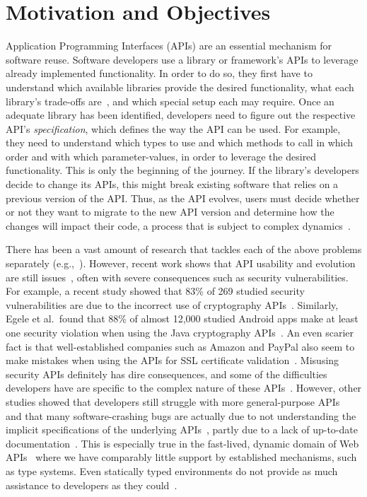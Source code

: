 \documentclass[sigconf]{acmart}
\newcommand{\updated}[1]{#1}
\begin{document}
\section{Motivation and Objectives}
Application Programming Interfaces (APIs) are an essential mechanism for software reuse. Software developers use a library or framework's APIs to leverage already implemented functionality. In order to do so, they first have to understand which available libraries provide the desired functionality, what each library's trade-offs are\updated{~\cite{ZHHK17}}, and which special setup each may require. Once an adequate library has been identified, developers need to figure out the respective API's \textit{specification}, which defines the way the API can be used. For example, they need to understand which types to use and which methods to call in which order and with which parameter-values, in order to leverage the desired functionality. This is only the beginning of the journey. If the library's developers decide to change its APIs, this might break existing software that relies on a previous version of the API\@. Thus, as the API evolves, users must decide whether or not they want to migrate to the new API version and determine how the changes will impact their code\updated{, a process that is subject to complex dynamics~\cite{JKR+17}}.

There has been a vast amount of research that tackles each of the above problems separately (e.g.,~\cite{Subramanian:2014,RobillardInferenceSurvey,RobillardLearn09, NNP+09, ThungLibRec}). However, recent work shows that API usability and evolution are still issues~\cite{NKMB16, BKHT:FSE16, SunshineAPIProtocol}, often with severe consequences such as security vulnerabilities. For example, a recent study showed that 83\% of 269 studied security vulnerabilities are due to the incorrect use of cryptography APIs~\cite{Lazar2014}. Similarly, Egele et al.~found that 88\% of almost 12,000 studied Android apps make at least one security violation when using the Java cryptography APIs~\cite{EgeleBFK13}. An even scarier fact is that well-established companies such as Amazon and PayPal also seem to make mistakes when using the APIs for SSL certificate validation~\cite{GeorgievIJABS12}. Misusing security APIs definitely has dire consequences, and some of the difficulties developers have are specific to the complex nature of these APIs~\cite{NKMB16}. However, other studies showed that developers still struggle with more general-purpose APIs~\cite{SunshineAPIProtocol} and that many software-crashing bugs are actually due to not understanding the implicit specifications of the underlying APIs~\cite{amani2016mubench}\updated{, partly due to a lack of up-to-date documentation~\cite{RMS17}. This is especially true in the fast-lived, dynamic domain of Web APIs~\cite{WYZ+17} where we have comparably little support by established mechanisms, such as type systems. Even statically typed environments do not provide as much assistance to developers as they could~\cite{KS17}.}
\end{document}
